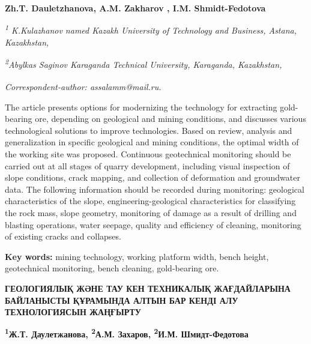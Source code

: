 
\begin{articleheader}

{\bfseries
Zh.T. Dauletzhanova\authorid,
A.M. Zakharov\textsuperscript{\envelope } \authorid,
I.M. Shmidt-Fedotova\authorid}
\end{articleheader}

\begin{affiliation}
\emph{\textsuperscript{1} K.Kulazhanov named Kazakh University of Technology and Business, Astana, Kazakhstan,}

\emph{\textsuperscript{2}Abylkas Saginov Karaganda Technical University, Karaganda, Kazakhstan,}

\raggedright \textsuperscript{\envelope }{\em Correspondent-author: \emph{assalamm@mail.ru.}}
\end{affiliation}

The article presents options for modernizing the technology for
extracting gold-bearing ore, depending on geological and mining
conditions, and discusses various technological solutions to improve
technologies. Based on review, analysis and generalization in specific
geological and mining conditions, the optimal width of the working site
was proposed. Continuous geotechnical monitoring should be carried out
at all stages of quarry development, including visual inspection of
slope conditions, crack mapping, and collection of deformation and
groundwater data. The following information should be recorded during
monitoring: geological characteristics of the slope,
engineering-geological characteristics for classifying the rock mass,
slope geometry, monitoring of damage as a result of drilling and
blasting operations, water seepage, quality and efficiency of cleaning,
monitoring of existing cracks and collapses.

{\bfseries Key words:} mining technology, working platform width, bench height,
geotechnical monitoring, bench cleaning, gold-bearing ore.

\begin{articleheader}
{\bfseries ГЕОЛОГИЯЛЫҚ ЖӘНЕ ТАУ КЕН ТЕХНИКАЛЫҚ ЖАҒДАЙЛАРЫНА БАЙЛАНЫСТЫ ҚҰРАМЫНДА АЛТЫН БАР КЕНДІ АЛУ ТЕХНОЛОГИЯСЫН ЖАҢҒЫРТУ}

{\bfseries
\textsuperscript{1}Ж.Т. Даулетжанова,
\textsuperscript{2}А.М. Захаров\textsuperscript{\envelope },
\textsuperscript{2}И.М. Шмидт-Федотова}
\end{articleheader}

